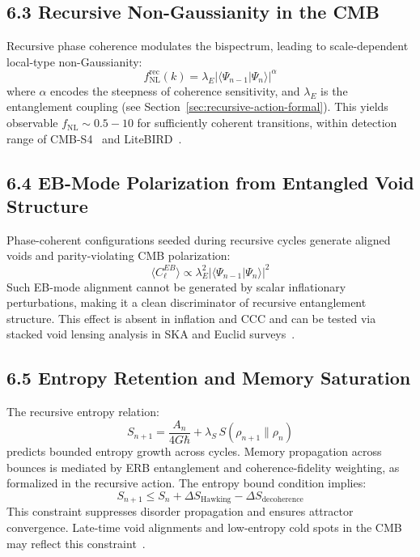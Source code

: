 \subsection{6.3 Recursive Non-Gaussianity in the CMB}

Recursive phase coherence modulates the bispectrum, leading to scale-dependent local-type non-Gaussianity:
\[
f_{\text{NL}}^{\text{rec}}(k) = \lambda_E \left|\langle \Psi_{n-1} | \Psi_n \rangle\right|^\alpha
\]
where \( \alpha \) encodes the steepness of coherence sensitivity, and \( \lambda_E \) is the entanglement coupling (see Section~\ref{sec:recursive-action-formal}). This yields observable \( f_{\text{NL}} \sim 0.5 - 10 \) for sufficiently coherent transitions, within detection range of CMB-S4~\cite{cmbs4forecast2019} and LiteBIRD~\cite{litebird2023}.

\subsection{6.4 EB-Mode Polarization from Entangled Void Structure}

Phase-coherent configurations seeded during recursive cycles generate aligned voids and parity-violating CMB polarization:
\[
\langle C_\ell^{EB} \rangle \propto \lambda_E^2 \left|\langle \Psi_{n-1} | \Psi_n \rangle\right|^2
\]
Such EB-mode alignment cannot be generated by scalar inflationary perturbations, making it a clean discriminator of recursive entanglement structure. This effect is absent in inflation and CCC and can be tested via stacked void lensing analysis in SKA and Euclid surveys~\cite{dewdney2009ska, laureijs2011euclid}.

\subsection{6.5 Entropy Retention and Memory Saturation}

The recursive entropy relation:
\[
S_{n+1} = \frac{A_{n}}{4G\hbar} + \lambda_S \, S(\rho_{n+1} \| \rho_n)
\]
predicts bounded entropy growth across cycles. Memory propagation across bounces is mediated by ERB entanglement and coherence-fidelity weighting, as formalized in the recursive action. The entropy bound condition implies:
\[
S_{n+1} \leq S_n + \Delta S_{\text{Hawking}} - \Delta S_{\text{decoherence}}
\]
This constraint suppresses disorder propagation and ensures attractor convergence. Late-time void alignments and low-entropy cold spots in the CMB may reflect this constraint~\cite{almheiri2019entropy}.

